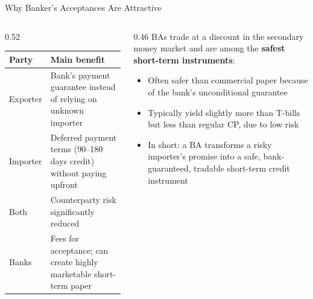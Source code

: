 \documentclass[aspectratio=169]{beamer}
\begin{document}
\begin{frame}{Why Banker's Acceptances Are Attractive}
\begin{columns}
\begin{column}{0.52\textwidth}
\begin{table}
\centering
\scriptsize
\begin{tabular}{p{}p{}}
\toprule
\textbf{Party} & \textbf{Main benefit} \\
\midrule
Exporter & Bank's payment guarantee instead of relying on unknown importer \\
Importer & Deferred payment terms (90--180 days credit) without paying upfront \\
Both & Counterparty risk significantly reduced \\
Banks & Fees for acceptance; can create highly marketable short-term paper \\
\bottomrule
\end{tabular}
\end{table}
\end{column}
\begin{column}{0.46\textwidth}
\footnotesize
BAs trade at a discount in the secondary money market and are among the \textbf{safest short-term instruments}:
\begin{itemize}
  \item Often safer than commercial paper because of the bank's unconditional guarantee
  \item Typically yield slightly more than T-bills but less than regular CP, due to low risk
  \item In short: a BA transforms a risky importer's promise into a safe, bank-guaranteed, tradable short-term credit instrument
\end{itemize}
\end{column}
\end{columns}
\end{frame}
\end{document}
